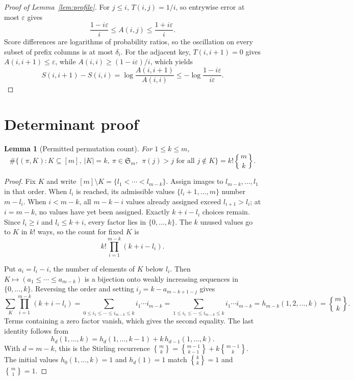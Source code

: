 \documentclass[10pt]{article}
\newtheorem{lemma}[theorem]{Lemma}
\theoremstyle{definition}
\newcommand{\Stirling}[2]{\genfrac{\{}{\}}{0pt}{}{#1}{#2}}
\begin{document}
\begin{proof}[Proof of Lemma~\ref{lem:profile}]
For \(j\le i\), \(T(i,j)=1/i\), so entrywise error at most \(\varepsilon\)
gives
\[
 \frac{1-i\varepsilon}{i}\le A(i,j)\le
 \frac{1+i\varepsilon}{i}.
\]
Score differences are logarithms of probability ratios, so the oscillation on
every subset of prefix columns is at most \(\delta_i\).  For the adjacent key,
\(T(i,i+1)=0\) gives \(A(i,i+1)\le\varepsilon\), while
\(A(i,i)\ge(1-i\varepsilon)/i\), which yields
\[
 S(i,i+1)-S(i,i)
 =\log\frac{A(i,i+1)}{A(i,i)}
 \le-\log\frac{1-i\varepsilon}{i\varepsilon}.
\]
\end{proof}

\section{Determinant proof}\label{app:determinant}

\begin{lemma}[Permitted permutation count]\label{lem:count}
For \(1\le k\le m\),
\[
 \#\bigl\{(\pi,K):K\subseteq[m],\ |K|=k,\ \pi\in\mathfrak S_m,\
 \ \pi(j)>j\text{ for all }j\notin K\bigr\}
 =k!\Stirling{m}{k}.
\]
\end{lemma}

\begin{proof}
Fix \(K\) and write \([m]\setminus K=\{l_1<\cdots<l_{m-k}\}\).
Assign images to \(l_{m-k},\ldots,l_1\) in that order.  When \(l_i\) is
reached, its admissible values \(\{l_i+1,\ldots,m\}\) number \(m-l_i\).
When \(i<m-k\), all \(m-k-i\) values already assigned exceed
\(l_{i+1}>l_i\); at \(i=m-k\), no values have yet been assigned.  Exactly
\(k+i-l_i\) choices remain.  Since \(l_i\ge i\) and \(l_i\le k+i\), every
factor lies in \(\{0,\ldots,k\}\).  The \(k\) unused values go to \(K\) in
\(k!\) ways, so the count for fixed \(K\) is
\[
 k!\prod_{i=1}^{m-k}(k+i-l_i).
\]

Put \(a_i=l_i-i\), the number of elements of \(K\) below \(l_i\).  Then
\(K\mapsto(a_1\le\cdots\le a_{m-k})\) is a bijection onto weakly increasing
sequences in \(\{0,\ldots,k\}\).  Reversing the order and setting
\(i_j=k-a_{m-k+1-j}\) gives
\[
 \sum_K\prod_{i=1}^{m-k}(k+i-l_i)
 =\sum_{0\le i_1\le\cdots\le i_{m-k}\le k}i_1\cdots i_{m-k}
 =\sum_{1\le i_1\le\cdots\le i_{m-k}\le k}i_1\cdots i_{m-k}
 =h_{m-k}(1,2,\ldots,k)
 =\Stirling{m}{k}.
\]
Terms containing a zero factor vanish, which gives the second equality.  The
last identity follows from
\[
 h_d(1,\ldots,k)=h_d(1,\ldots,k-1)+k\,h_{d-1}(1,\ldots,k).
\]
With \(d=m-k\), this is the Stirling recurrence
\(\Stirling{m}{k}=\Stirling{m-1}{k-1}+k\Stirling{m-1}{k}\).
The initial values \(h_0(1,\ldots,k)=1\) and
\(h_d(1)=1\) match \(\Stirling{k}{k}=1\) and
\(\Stirling{m}{1}=1\).
\end{proof}
\end{document}
